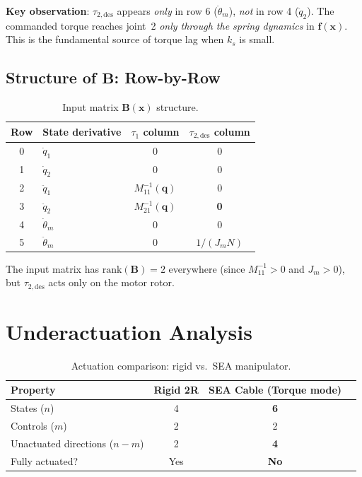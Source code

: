 \documentclass[11pt, a4paper]{article}
\newcommand{\bq}{\bm{q}}
\newcommand{\bx}{\bm{x}}
\newcommand{\bB}{\bm{B}}
\begin{document}
\begin{mdframed}
\textbf{Key observation}: $\tau_{2,\text{des}}$ appears \emph{only} in
row 6 ($\ddot{\theta}_m$), \emph{not} in row 4 ($\ddot{q}_2$).
The commanded torque reaches joint~2 \emph{only through the spring dynamics}
in $\bm{f}(\bx)$.  This is the fundamental source of torque lag when $k_s$ is
small.
\end{mdframed}

\subsection{Structure of \texorpdfstring{$\bB$}{B}: Row-by-Row}

\begin{table}[h]
\centering
\caption{Input matrix $\bB(\bx)$ structure.}
\label{tab:B-structure}
\begin{tabular}{@{}clcc@{}}
\toprule
Row & State derivative & $\tau_1$ column & $\tau_{2,\text{des}}$ column \\
\midrule
0 & $\dot{q}_1$            & 0    & 0 \\
1 & $\dot{q}_2$            & 0    & 0 \\
2 & $\ddot{q}_1$           & $M^{-1}_{11}(\bq)$ & 0 \\
3 & $\ddot{q}_2$           & $M^{-1}_{21}(\bq)$ & \textbf{0} \\
4 & $\dot{\theta}_m$       & 0    & 0 \\
5 & $\ddot{\theta}_m$      & 0    & $1/(J_m N)$ \\
\bottomrule
\end{tabular}
\end{table}

The input matrix has $\text{rank}(\bB) = 2$ everywhere (since $M^{-1}_{11} > 0$
and $J_m > 0$), but $\tau_{2,\text{des}}$ acts only on the motor rotor.


\section{Underactuation Analysis}
\label{sec:underact}

\begin{table}[h]
\centering
\caption{Actuation comparison: rigid vs.\ SEA manipulator.}
\label{tab:actuation}
\begin{tabular}{@{}lccc@{}}
\toprule
Property & Rigid 2R & SEA Cable (Torque mode) \\
\midrule
States ($n$)   & 4 & \textbf{6} \\
Controls ($m$) & 2 & 2 \\
Unactuated directions ($n - m$) & 2 & \textbf{4} \\
Fully actuated? & Yes & \textbf{No} \\
\bottomrule
\end{tabular}
\end{table}
\end{document}
